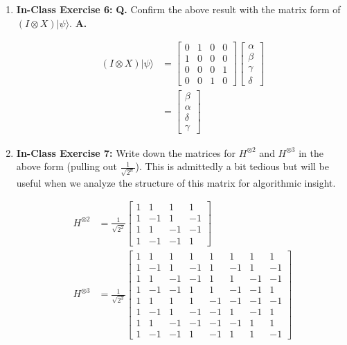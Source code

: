 \documentclass[main.tex]{subfiles}
\begin{document}
\begin{enumerate}
\item[] \textbf{In-Class Exercise 6:} \textbf{Q.} Confirm the above result with the matrix form of $(I \otimes X)|\psi\rangle$. \textbf{A.}

    \begin{align*}
        (I \otimes X)|\psi\rangle   & = \left[\begin{array}{llll}0&1&0&0\\1&0&0&0\\0&0&0&1\\0&0&1&0\end{array}\right]
                                    \left[\begin{array}{l}\alpha\\\beta\\\gamma\\\delta\end{array}\right]\\
                                    & = \left[\begin{array}{l}\beta\\\alpha\\\delta\\\gamma\end{array}\right]
    \end{align*}

\item[] \textbf{In-Class Exercise 7:} Write down the matrices for $H^{\otimes 2}$ and  $H^{\otimes 3}$ in the above form (pulling out $\frac{1}{\sqrt{2^{n}}}$). This is admittedly a bit tedious but will be useful when we analyze the structure of this matrix for algorithmic insight.

    \begin{align*}
        H^{\otimes 2}   & = \frac{1}{\sqrt{2^2}} \left[\begin{array}{llll}1&1&1&1\\1&-1&1&-1\\
                        1&1&-1&-1\\1&-1&-1&1\end{array}\right]\\
        H^{\otimes 3}   & = \frac{1}{\sqrt{2^3}} \left[\begin{array}{llllllll}1&1&1&1&1&1&1&1\\
                        1&-1&1&-1&1&-1&1&-1\\
                        1&1&-1&-1&1&1&-1&-1\\
                        1&-1&-1&1&1&-1&-1&1\\
                        1&1&1&1&-1&-1&-1&-1\\
                        1&-1&1&-1&-1&1&-1&1\\
                        1&1&-1&-1&-1&-1&1&1\\
                        1&-1&-1&1&-1&1&1&-1\end{array}\right]     
    \end{align*}


\end{enumerate}
\end{document}
